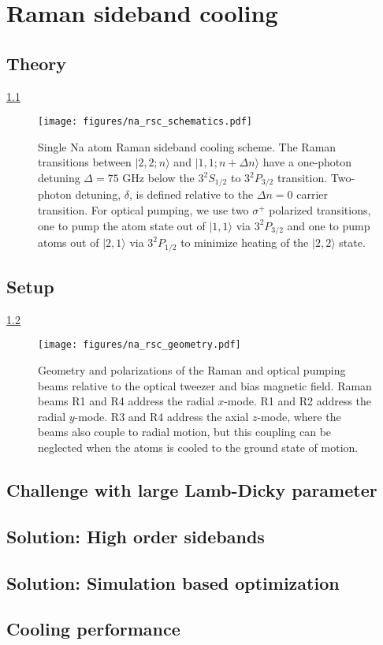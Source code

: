 
\chapter{Raman sideband cooling}

\section{Theory}

\ref{fig:na-rsc-schematics}

\begin{figure}
  \centering
  \texttt{[image: figures/na\_rsc\_schematics.pdf]}
  \caption[Schematics of Raman sideband cooling for Sodium.]{
    Single Na atom Raman sideband cooling scheme.
    The Raman transitions between $|2,2;n\rangle$ and $|1,1;n+\Delta n\rangle$
    have a one-photon detuning $\Delta=75$ GHz below the $3^2S_{1/2}$ to $3^2P_{3/2}$ transition.
    Two-photon detuning, $\delta$, is defined relative to the $\Delta n=0$ carrier transition.
    For optical pumping, we use two $\sigma^+$ polarized transitions,
    one to pump the atom state out of $|1,1\rangle$ via $3^2P_{3/2}$
    and one to pump atoms out of $|2,1\rangle$ via $3^2P_{1/2}$
    to minimize heating of the $|2,2\rangle$ state.
    \label{fig:na-rsc-schematics}}
\end{figure}

\section{Setup}

\ref{fig:na-rsc-geometry}

\begin{figure}
  \centering
  \texttt{[image: figures/na\_rsc\_geometry.pdf]}
  \caption[Beams and field geometry for Sodium Raman sideband cooling]{
    Geometry and polarizations of the Raman and optical pumping beams relative to the
    optical tweezer and bias magnetic field.
    Raman beams R1 and R4 address the radial $x$-mode.
    R1 and R2 address the radial $y$-mode.
    R3 and R4 address the axial $z$-mode, where the beams also couple to radial motion,
    but this coupling can be neglected when the atoms is cooled to the ground state of motion.
    \label{fig:na-rsc-geometry}}
\end{figure}

\section{Challenge with large Lamb-Dicky parameter}

\section{Solution: High order sidebands}

\section{Solution: Simulation based optimization}

\section{Cooling performance}
